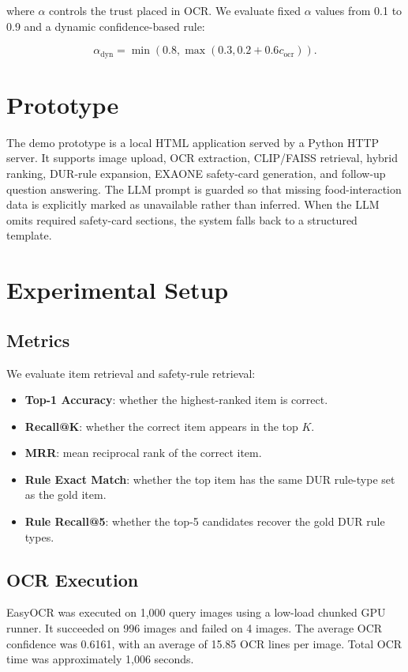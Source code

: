 \documentclass[sigconf,screen,nonacm]{acmart}
\begin{document}
where $\alpha$ controls the trust placed in OCR. We evaluate fixed $\alpha$ values from 0.1 to 0.9 and a dynamic confidence-based rule:

\begin{equation}
\alpha_{\mathrm{dyn}} = \min(0.8, \max(0.3, 0.2 + 0.6c_{\mathrm{ocr}})).
\end{equation}

\section{Prototype}
The demo prototype is a local HTML application served by a Python HTTP server. It supports image upload, OCR extraction, CLIP/FAISS retrieval, hybrid ranking, DUR-rule expansion, EXAONE safety-card generation, and follow-up question answering. The LLM prompt is guarded so that missing food-interaction data is explicitly marked as unavailable rather than inferred. When the LLM omits required safety-card sections, the system falls back to a structured template.

\section{Experimental Setup}
\subsection{Metrics}
We evaluate item retrieval and safety-rule retrieval:
\begin{itemize}[leftmargin=*]
    \item \textbf{Top-1 Accuracy}: whether the highest-ranked item is correct.
    \item \textbf{Recall@K}: whether the correct item appears in the top $K$.
    \item \textbf{MRR}: mean reciprocal rank of the correct item.
    \item \textbf{Rule Exact Match}: whether the top item has the same DUR rule-type set as the gold item.
    \item \textbf{Rule Recall@5}: whether the top-5 candidates recover the gold DUR rule types.
\end{itemize}

\subsection{OCR Execution}
EasyOCR was executed on 1,000 query images using a low-load chunked GPU runner. It succeeded on 996 images and failed on 4 images. The average OCR confidence was 0.6161, with an average of 15.85 OCR lines per image. Total OCR time was approximately 1,006 seconds.
\end{document}
